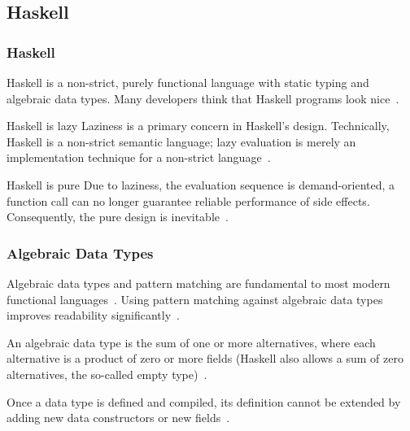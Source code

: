 \subsection{Haskell}
\begin{frame}\frametitle{Haskell}

Haskell is a non-strict, purely functional language with static typing and algebraic data types. Many developers think that Haskell programs look nice~\cite{history-of-haskell}.

\footnotesize

\begin{block}{Haskell is lazy}
    Laziness is a primary concern in Haskell's design. Technically, Haskell is a non-strict semantic language; lazy evaluation is merely an implementation technique for a non-strict language~\cite{history-of-haskell}.
\end{block}

\begin{block}{Haskell is pure}
Due to laziness, the evaluation sequence is demand-oriented, a function call can no longer guarantee reliable performance of side effects. Consequently, the pure design is inevitable~\cite{history-of-haskell}.
\end{block}

\end{frame}

\begin{frame}\frametitle{Algebraic Data Types}

Algebraic data types and pattern matching are fundamental to most modern functional languages~\cite{trees-that-grow}. Using pattern matching against algebraic data types improves readability significantly~\cite{history-of-haskell}.

An algebraic data type is the sum of one or more alternatives, where each alternative is a product of zero or more fields (Haskell also allows a sum of zero alternatives, the so-called empty type)~\cite{history-of-haskell}. 
        

Once a data type is defined and compiled, its definition cannot be extended by adding new data constructors or new fields~\cite{trees-that-grow}.

\end{frame}

